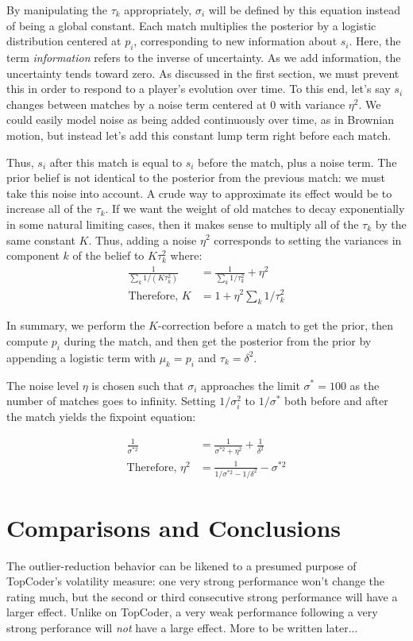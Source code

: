 \documentclass{article}
\begin{document}
By manipulating the $\tau_k$ appropriately, $\sigma_i$ will be defined by this equation instead of being a global constant. Each match multiplies the posterior by a logistic distribution centered at $p_i$, corresponding to new information about $s_i$. Here, the term \emph{information} refers to the inverse of uncertainty. As we add information, the uncertainty tends toward zero. As discussed in the first section, we must prevent this in order to respond to a player's evolution over time. To this end, let's say $s_i$ changes between matches by a noise term centered at $0$ with variance $\eta^2$. We could easily model noise as being added continuously over time, as in Brownian motion, but instead let's add this constant lump term right before each match.

Thus, $s_i$ after this match is equal to $s_i$ before the match, plus a noise term. The prior belief is not identical to the posterior from the previous match: we must take this noise into account. A crude way to approximate its effect would be to increase all of the $\tau_k$. If we want the weight of old matches to decay exponentially in some natural limiting cases, then it makes sense to multiply all of the $\tau_k$ by the same constant $K$. Thus, adding a noise $\eta^2$ corresponds to setting the variances in component $k$ of the belief to $K\tau_k^2$ where:
\begin{align}
\frac{1}{\sum_k 1/(K\tau_k^2)} &= \frac{1}{\sum_k 1/\tau_k^2} + \eta^2
\\ \text{Therefore, }K &= 1 + \eta^2\sum_k 1/\tau_k^2
\end{align}

In summary, we perform the $K$-correction before a match to get the prior, then compute $p_i$ during the match, and then get the posterior from the prior by appending a logistic term with $\mu_k = p_i$ and $\tau_k = \delta^2$.

The noise level $\eta$ is chosen such that $\sigma_i$ approaches the limit $\sigma^* = 100$ as the number of matches goes to infinity. Setting $1/\sigma_i^2$ to $1/\sigma^*$ both before and after the match yields the fixpoint equation:

\begin{align}
\frac{1}{\sigma^{*2}} &= \frac{1}{\sigma^{*2} + \eta^2} + \frac{1}{\delta^2}
\\ \text{Therefore, }\eta^2 &= \frac{1}{1/\sigma^{*2} - 1/\delta^2} - \sigma^{*2}
\end{align}

\section{Comparisons and Conclusions}

The outlier-reduction behavior can be likened to a presumed purpose of TopCoder's volatility measure: one very strong performance won't change the rating much, but the second or third consecutive strong performance will have a larger effect. Unlike on TopCoder, a very weak performance following a very strong perforance will \emph{not} have a large effect. More to be written later...
\end{document}
